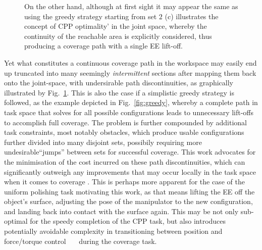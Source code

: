 \documentclass[journal]{IEEEtran}
\begin{document}
\begin{figure}[t]
{On the other hand, although at first sight it may appear the same as using the greedy strategy starting from set $2$ (c) illustrates the concept of CPP optimality' in the joint space, whereby the continuity of the reachable area is explicitly considered, thus producing a coverage path with a single EE lift-off.} 
\label{fig1}
\end{figure}

Yet what constitutes a continuous coverage path in the workspace may easily end up truncated into many seemingly \textit{intermittent} sections after mapping them back onto the joint-space, with undersirable path discontinuities, as graphically illustrated by Fig.~\ref{fig1}. 
This is also the case if a simplistic greedy strategy is followed, as the example depicted in Fig.~\ref{fig:greedy}, whereby a complete path in task space that solves for all possible configurations leads to unnecessary lift-offs to accomplish full coverage. 
The problem is further compounded by additional task constraints, most notably obstacles, which produce usable configurations further divided into many disjoint sets, possibily requiring more undesirable``jumps'' between sets for successful coverage. 
This work advocates for the minimisation of the cost incurred on these path discontinuities, which can significantly outweigh
any improvements that may occur locally in the task space when it comes to coverage \cite{hassan2018a}. %
This is perhaps more apparent for the case of the uniform polishing task motivating this work, as that means lifting the EE off the object's surface, adjusting the pose of the manipulator to the new configuration, and landing back into contact with the surface again.
This may be not only sub-optimal for the speedy completion of the CPP task, but also introduces potentially avoidable complexity in transitioning between position and force/torque control~\cite{heck2015switched}~\cite{solanes2018adaptive}~\cite{solanes2019robust} during the coverage task. 
 
\end{document}

